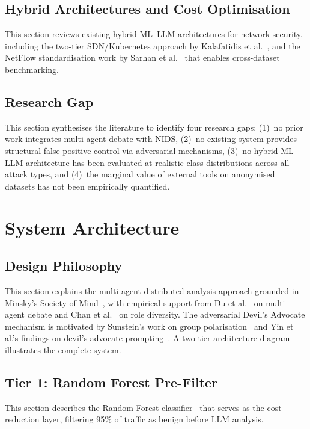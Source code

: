 \documentclass[12pt,openany,oneside,a4paper]{book}
\begin{document}
\section{Hybrid Architectures and Cost Optimisation}
\label{sec:hybrid-architectures}
This section reviews existing hybrid ML--LLM architectures for network security, including the two-tier SDN/Kubernetes approach by Kalafatidis et al.~\autocite{Kalafatidis2025}, and the NetFlow standardisation work by Sarhan et al.~\autocite{Sarhan2021} that enables cross-dataset benchmarking.

\section{Research Gap}
\label{sec:research-gap}
This section synthesises the literature to identify four research gaps: (1)~no prior work integrates multi-agent debate with NIDS, (2)~no existing system provides structural false positive control via adversarial mechanisms, (3)~no hybrid ML--LLM architecture has been evaluated at realistic class distributions across all attack types, and (4)~the marginal value of external tools on anonymised datasets has not been empirically quantified.


\chapter{System Architecture}
\label{ch:architecture}

\section{Design Philosophy}
\label{sec:design-philosophy}
This section explains the multi-agent distributed analysis approach grounded in Minsky's Society of Mind~\autocite{Minsky1986}, with empirical support from Du et al.~\autocite{Du2023} on multi-agent debate and Chan et al.~\autocite{Chan2023} on role diversity. The adversarial Devil's Advocate mechanism is motivated by Sunstein's work on group polarisation~\autocite{Sunstein2002} and Yin et al.'s findings on devil's advocate prompting~\autocite{Yin2024}. A two-tier architecture diagram illustrates the complete system.

\section{Tier 1: Random Forest Pre-Filter}
\label{sec:tier1-rf}
This section describes the Random Forest classifier~\autocite{Breiman2001} that serves as the cost-reduction layer, filtering 95\% of traffic as benign before LLM analysis.
\end{document}
